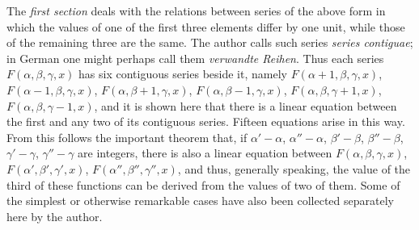 The \textit{first section} deals with the relations between series of the above form in which the values of one of the first three elements differ by one unit, while those of the remaining three are the same. The author calls such series \textit{series contiguae}; in German one might perhaps call them \textit{verwandte Reihen}. Thus each series $F(\alpha,\beta,\gamma,x)$ has six contiguous series beside it, namely $F(\alpha+1,\beta,\gamma,x)$, $F(\alpha-1,\beta,\gamma,x)$, $F(\alpha,\beta+1,\gamma,x)$, $F(\alpha,\beta-1,\gamma,x)$, $F(\alpha,\beta,\gamma+1,x)$, $F(\alpha,\beta,\gamma-1,x)$, and it is shown here that there is a linear equation between the first and any two of its contiguous series. Fifteen equations arise in this way. From this follows the important theorem that, if $\alpha'-\alpha$, $\alpha''-\alpha$, $\beta'-\beta$, $\beta''-\beta$, $\gamma'-\gamma$, $\gamma''-\gamma$ are integers, there is also a linear equation between $F(\alpha,\beta,\gamma,x)$, $F(\alpha',\beta',\gamma',x)$, $F(\alpha'',\beta'',\gamma'',x)$, and thus, generally speaking, the value of the third of these functions can be derived from the values of two of them. Some of the simplest or otherwise remarkable cases have also been collected separately here by the author.

